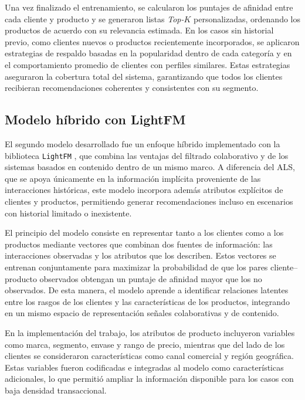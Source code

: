 Una vez finalizado el entrenamiento, se calcularon los puntajes de afinidad entre cada cliente y producto y se generaron listas \textit{Top-$K$} personalizadas, ordenando los productos de acuerdo con su relevancia estimada. En los casos sin historial previo, como clientes nuevos o productos recientemente incorporados, se aplicaron estrategias de respaldo basadas en la popularidad dentro de cada categoría y en el comportamiento promedio de clientes con perfiles similares. Estas estrategias aseguraron la cobertura total del sistema, garantizando que todos los clientes recibieran recomendaciones coherentes y consistentes con su segmento.

\subsection{Modelo híbrido con LightFM}

El segundo modelo desarrollado fue un enfoque híbrido implementado con la biblioteca \texttt{LightFM} \cite{ARTICLE:LightFM2015}, que combina las ventajas del filtrado colaborativo y de los sistemas basados en contenido dentro de un mismo marco. A diferencia del ALS, que se apoya únicamente en la información implícita proveniente de las interacciones históricas, este modelo incorpora además atributos explícitos de clientes y productos, permitiendo generar recomendaciones incluso en escenarios con historial limitado o inexistente.

El principio del modelo consiste en representar tanto a los clientes como a los productos mediante vectores que combinan dos fuentes de información: las interacciones observadas y los atributos que los describen. Estos vectores se entrenan conjuntamente para maximizar la probabilidad de que los pares cliente–producto observados obtengan un puntaje de afinidad mayor que los no observados. De esta manera, el modelo aprende a identificar relaciones latentes entre los rasgos de los clientes y las características de los productos, integrando en un mismo espacio de representación señales colaborativas y de contenido.

En la implementación del trabajo, los atributos de producto incluyeron variables como marca, segmento, envase y rango de precio, mientras que del lado de los clientes se consideraron características como canal comercial y región geográfica. Estas variables fueron codificadas e integradas al modelo como características adicionales, lo que permitió ampliar la información disponible para los casos con baja densidad transaccional.

